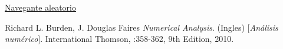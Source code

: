 \begin{thebibliography}{9}


\href{http://www-2.dc.uba.ar/materias/metnum/dnload/2018_C1/tp1/Enunciado_TP1.pdf}{Navegante aleatorio}

Richard L. Burden, J. Douglas Faires
\textit{Numerical Analysis}. (Ingles) 
[\textit{An\'alisis num\'erico}]. 
International Thomson, :358-362, 9th Edition, 2010.

\end{thebibliography}